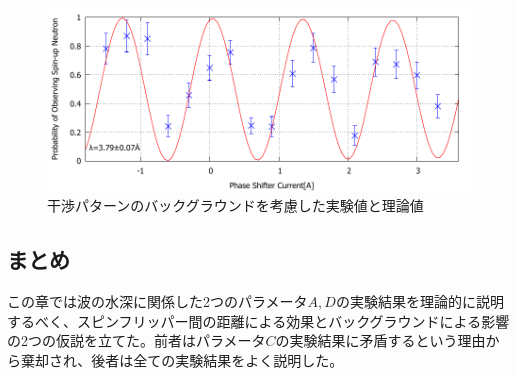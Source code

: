 \begin{figure}[H]
\begin{minipage}{0.5\hsize}
\end{minipage}
\begin{minipage}{0.5\hsize}
\includegraphics[width=\hsize]{discussion/BG/IT_eb_530.pdf}
\end{minipage}
\caption{干渉パターンのバックグラウンドを考慮した実験値と理論値}\label{Disucussion_BG_fig_IT_eb}
\end{figure}

\subsection{まとめ}
この章では波の水深に関係した2つのパラメータ$A, D$の実験結果を理論的に説明するべく、スピンフリッパー間の距離による効果とバックグラウンドによる影響の2つの仮説を立てた。前者はパラメータ$C$の実験結果に矛盾するという理由から棄却され、後者は全ての実験結果をよく説明した。

